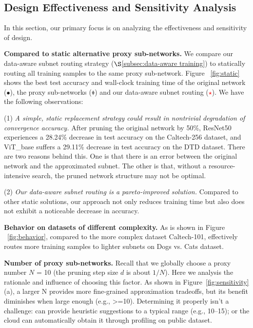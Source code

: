 





\subsection{Design Effectiveness and Sensitivity Analysis}
\label{subsec: sensitivity}
In this section, our primary focus is on analyzing the effectiveness and sensitivity of \sys design.

\noindent \textbf{Compared to static alternative proxy sub-networks.}
We compare our data-aware subnet routing strategy ($\S$\ref{subsec:data-aware training}) to statically routing all training samples to the same proxy sub-network.
Figure ~\ref{fig:static} shows the best test accuracy and wall-clock training time of the original network ($\bullet$), the proxy sub-networks (\textcolor{gray}{\scriptsize $\blacklozenge$}) and our data-aware subnet routing (\textcolor{red}{$\star$}).
We have the following observations:

(1) \textit{A simple, static replacement strategy could result in nontrivial degradation of convergence accuracy.}
After pruning the original network by 50\%, ResNet50 experiences a 28.24\% decrease in test accuracy on the Caltech-256 dataset, and ViT\_base suffers a 29.11\% decrease in test accuracy on the DTD dataset.
There are two reasons behind this. 
One is that there is an error between the original network and the approximated subnet. 
The other is that, without a resource-intensive search, the pruned network structure may not be optimal.



(2) \textit{Our data-aware subnet routing is a pareto-improved solution.}
Compared to other static solutions, our approach not only reduces training time but also does not exhibit a noticeable decrease in accuracy.

\noindent \textbf{Behavior on datasets of different complexity.}
As is shown in Figure ~\ref{fig:behavior}, compared to the more complex dataset Caltech-101, \sys effectively routes more training samples to lighter subnets on Dogs vs. Cats dataset.

\noindent \textbf{Number of proxy sub-networks.}
Recall that we globally choose a proxy number $N$ = 10 (the pruning step size $d$ is about $1/N$).
Here we analysis the rationale and influence of choosing this factor.
As shown in Figure~\ref{fig:sensitivity}(a), a larger N provides more fine-grained approximation tradeoffs, but its benefit diminishes when large enough (e.g., >=10). 
Determining it properly isn't a challenge: \sys can provide heuristic suggestions to a typical range (e.g., 10--15); or the cloud can automatically obtain it through profiling on public dataset.

